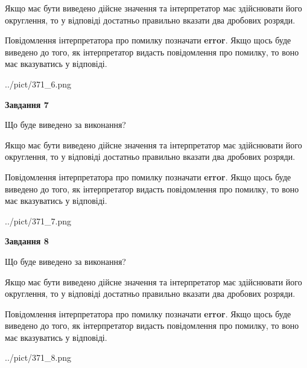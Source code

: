 \documentclass[12pt, ukrainian]{article}
\begin{document}
{\begin {Large}
Якщо має бути виведено дійсне значення та інтерпретатор має здійснювати його округлення, 
то у відповіді достатньо правильно вказати два дробових розряди.

Повідомлення інтерпретатора про помилку позначати \textbf{error}.
Якщо щось буде виведено до того, як інтерпретатор видасть повідомлення про помилку, 
то воно має вказуватись у відповіді. \par

\begin{center}
	{../pict/371_6.png}
\end{center}
\newpage

{\begin {center}\textbf{Завдання 7}\end {center}}\par
Що буде виведено за виконання? \par

Якщо має бути виведено дійсне значення та інтерпретатор має здійснювати його округлення, 
то у відповіді достатньо правильно вказати два дробових розряди.

Повідомлення інтерпретатора про помилку позначати \textbf{error}.
Якщо щось буде виведено до того, як інтерпретатор видасть повідомлення про помилку, 
то воно має вказуватись у відповіді. \par

\begin{center}
	{../pict/371_7.png}
\end{center}
\newpage

{\begin {center}\textbf{Завдання 8}\end {center}}\par
Що буде виведено за виконання? \par

Якщо має бути виведено дійсне значення та інтерпретатор має здійснювати його округлення, 
то у відповіді достатньо правильно вказати два дробових розряди.

Повідомлення інтерпретатора про помилку позначати \textbf{error}.
Якщо щось буде виведено до того, як інтерпретатор видасть повідомлення про помилку, 
то воно має вказуватись у відповіді. \par

\begin{center}
	{../pict/371_8.png}
\end{center}
\newpage


\end{Large}}
\end{document}
